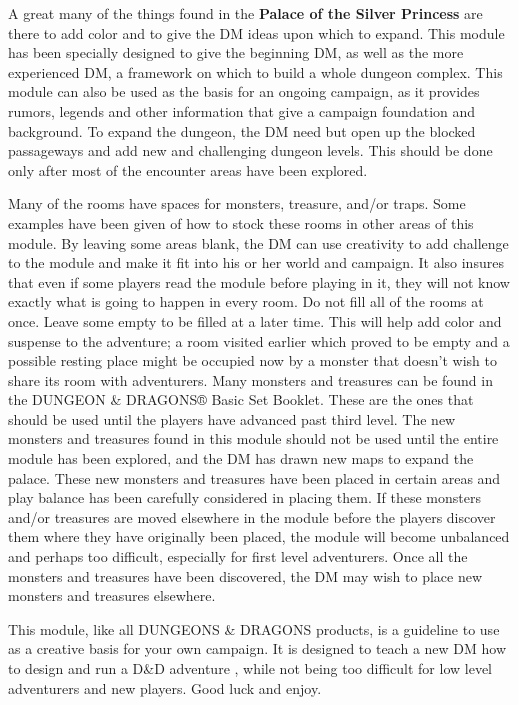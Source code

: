 \documentclass[palace_of_the_silver_princess]{subfiles}
\begin{document}
\selectfont
\clearpage


A great many of the things found in the \textbf{Palace of the Silver
Princess} are there to add color and to give the DM ideas upon which to
expand. This module has been specially designed to give the beginning
DM, as well as the more experienced DM, a framework on which to build a
whole dungeon complex. This module can also be used as the basis for an
ongoing campaign, as it provides rumors, legends and other information
that give a campaign foundation and background. To expand the dungeon,
the DM need but open up the blocked passageways and add new and
challenging dungeon levels.  This should be done only after most of the
encounter areas have been explored.

Many of the rooms have spaces for monsters, treasure, and/or traps. Some
examples have been given of how to stock these rooms in other areas of
this module. By leaving some areas blank, the DM can use creativity to
add challenge to the module and make it fit into his or her world and
campaign. It also insures that even if some players read the module
before playing in it, they will not know exactly what is going to happen
in every room. Do not fill all of the rooms at once. Leave some empty to
be filled at a later time. This will help add color and suspense to the
adventure; a room visited earlier which proved to be empty and a
possible resting place might be occupied now by a monster that doesn’t
wish to share its room with adventurers. Many monsters and treasures can
be found in the DUNGEON \& DRAGONS® Basic Set Booklet. These are the ones
that should be used until the players have advanced past third level.
The new monsters and treasures found in this module should not be used
until the entire module has been explored, and the DM has drawn new maps
to expand the palace. These new monsters and treasures have been placed
in certain areas and play balance has been carefully considered in
placing them. If these monsters and/or treasures are moved elsewhere in
the module before the players discover them where they have originally
been placed, the module will become unbalanced and perhaps too
difficult, especially for first level adventurers. Once all the monsters
and treasures have been discovered, the DM may wish to place new
monsters and treasures elsewhere.

This module, like all DUNGEONS \& DRAGONS products, is a guideline to use
as a creative basis for your own campaign. It is designed to teach a new
DM how to design and run a D\&D adventure , while not being too difficult
for low level adventurers and new players. Good luck and enjoy.
\end{document}
